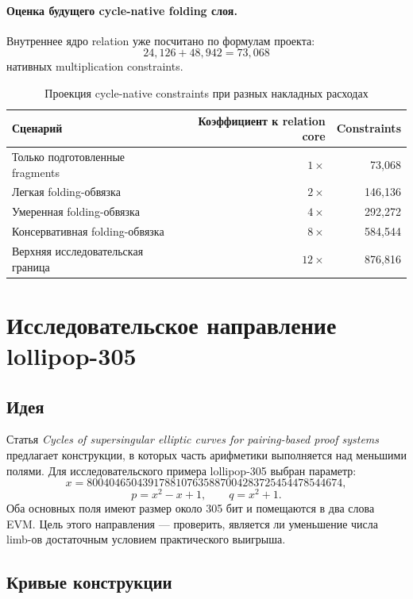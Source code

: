 \documentclass[12pt,a4paper]{article}
\begin{document}
\paragraph{Оценка будущего cycle-native folding слоя.}
Внутреннее ядро relation уже посчитано по формулам проекта:
\[
    24{,}126+48{,}942=73{,}068
\]
нативных multiplication constraints. 

\begin{table}[htbp]
\centering
\caption{Проекция cycle-native constraints при разных накладных расходах}
\small
\begin{tabular}{l r r}
\toprule
Сценарий & Коэффициент к relation core & Constraints \\
\midrule
Только подготовленные fragments & $1\times$ & 73,068 \\
Легкая folding-обвязка & $2\times$ & 146,136 \\
Умеренная folding-обвязка & $4\times$ & 292,272 \\
Консервативная folding-обвязка & $8\times$ & 584,544 \\
Верхняя исследовательская граница & $12\times$ & 876,816 \\
\bottomrule
\end{tabular}
\end{table}

\section{Исследовательское направление lollipop-305}

\subsection{Идея}

Статья \emph{Cycles of supersingular elliptic curves for pairing-based proof
systems}~\cite{eprint1627} предлагает конструкции, в которых часть
арифметики выполняется над меньшими полями. Для исследовательского примера
lollipop-305 выбран параметр:
\[
    x=8004046504391788107635887004283725454478544674,
\]
\[
    p=x^2-x+1,\qquad q=x^2+1.
\]
Оба основных поля имеют размер около 305 бит и помещаются в два слова EVM.
Цель этого направления --- проверить, является ли уменьшение числа limb-ов
достаточным условием практического выигрыша. 

\subsection{Кривые конструкции}
\end{document}
